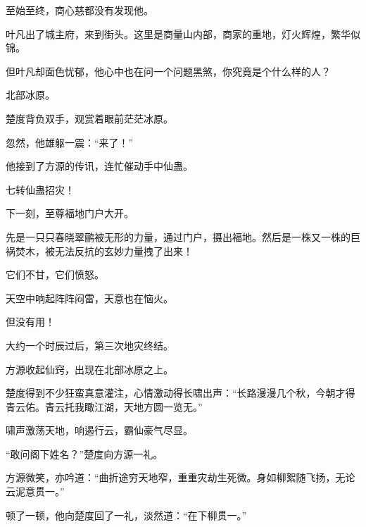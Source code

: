 \begin{this_body}
至始至终，商心慈都没有发现他。

叶凡出了城主府，来到街头。这里是商量山内部，商家的重地，灯火辉煌，繁华似锦。

但叶凡却面色忧郁，他心中也在问一个问题黑煞，你究竟是个什么样的人？

北部冰原。

楚度背负双手，观赏着眼前茫茫冰原。

忽然，他雄躯一震：“来了！”

他接到了方源的传讯，连忙催动手中仙蛊。

七转仙蛊招灾！

下一刻，至尊福地门户大开。

先是一只只春晓翠鹂被无形的力量，通过门户，摄出福地。然后是一株又一株的巨祸焚木，被无法反抗的玄妙力量拽了出来！

它们不甘，它们愤怒。

天空中响起阵阵闷雷，天意也在恼火。

但没有用！

大约一个时辰过后，第三次地灾终结。

方源收起仙窍，出现在北部冰原之上。

楚度得到不少狂蛮真意灌注，心情激动得长啸出声：“长路漫漫几个秋，今朝才得青云佑。青云托我瞰江湖，天地方圆一览无。”

啸声激荡天地，响遏行云，霸仙豪气尽显。

“敢问阁下姓名？”楚度向方源一礼。

方源微笑，亦吟道：“曲折途穷天地窄，重重灾劫生死微。身如柳絮随飞扬，无论云泥意贯一。”

顿了一顿，他向楚度回了一礼，淡然道：“在下柳贯一。”

\end{this_body}

